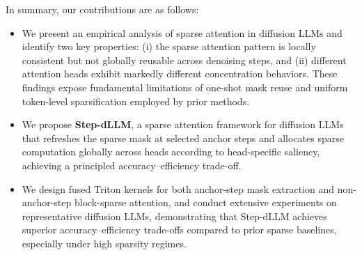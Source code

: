 In summary, our contributions are as follows:
\begin{itemize}
    \item We present an empirical analysis of sparse attention in diffusion LLMs and identify two key properties: (i) the sparse attention pattern is locally consistent but not globally reusable across denoising steps, and (ii) different attention heads exhibit markedly different concentration behaviors. These findings expose fundamental limitations of one-shot mask reuse and uniform token-level sparsification employed by prior methods.

    \item We propose \textbf{Step-dLLM}, a sparse attention framework for diffusion LLMs that refreshes the sparse mask at selected anchor steps and allocates sparse computation globally across heads according to head-specific saliency, achieving a principled accuracy--efficiency trade-off.

    \item We design fused Triton kernels for both anchor-step mask extraction and non-anchor-step block-sparse attention, and conduct extensive experiments on representative diffusion LLMs, demonstrating that Step-dLLM achieves superior accuracy--efficiency trade-offs compared to prior sparse baselines, especially under high sparsity regimes.
\end{itemize}
